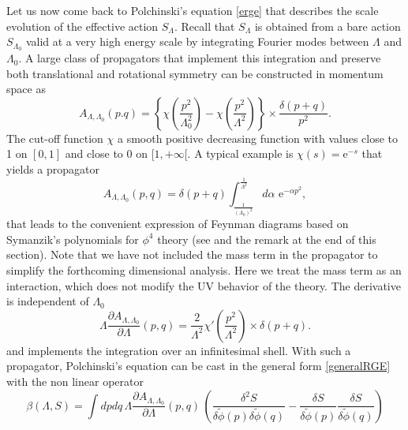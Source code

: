 \documentclass[10pt,here,feynmf]{article}
\begin{document}
Let us now come back to Polchinski's equation \eqref{erge} that describes the scale evolution of the effective action $S_{\Lambda}$. Recall that $S_{\Lambda}$ is obtained from a bare action $S_{\Lambda_{0}}$ valid at a very high energy scale by integrating Fourier modes between $\Lambda$ and $\Lambda_{0}$. A large class of propagators that implement this integration and preserve both translational and rotational symmetry can be constructed in momentum space as
\begin{equation}    
A_{\Lambda,\Lambda_{0}}(p.q)=
\left\{\chi\left(\frac{p^{2}}{\Lambda_{0}^{2}}\right)-\chi\left(\frac{p^{2}}{\Lambda^{2}}\right)\right\}
\times\frac{\delta(p+q)}{p^{2}}.
\end{equation}
The cut-off function $\chi$ a smooth positive decreasing function with values close to 1 on $[0,1]$ and close to 0 on $[1,+\infty[$. A typical example is $\chi(s)=\mathrm{e}^{-s}$ that yields a propagator 
\begin{equation}
A_{\Lambda,\Lambda_{0}}(p,q)=\delta(p+q)\int^{\frac{1}{\Lambda^{2}}}_{\frac{1}{(\Lambda_{0})^{2}}}\!\!d\alpha\,\,\mathrm{e}^{-\alpha p^{2}},
\end{equation}
that leads to the convenient expression of Feynman diagrams based on Symanzik's polynomials for $\phi^{4}$ theory (see \cite{Rivasseau} and the remark at the end of this section). Note that we have not included the mass term in the propagator to simplify the forthcoming dimensional analysis. Here we treat the mass term as an interaction, which does not modify the UV behavior of the theory.  The derivative is independent of $\Lambda_{0}$
\begin{equation}
\Lambda\frac{\partial A_{\Lambda,\Lambda_{0}}}{\partial\Lambda}(p,q)=
\frac{2}{\Lambda^{2}}\chi'\left(\frac{p^{2}}{\Lambda^{2}}\right)
\times\delta(p+q).
\end{equation}
and implements the integration over an infinitesimal shell.  With such a propagator, Polchinski's equation can be cast in the general form \eqref{generalRGE} with the non linear operator
\begin{equation}
\beta(\Lambda,S)=\int dpdq\,\Lambda\frac{\partial A_{\Lambda,\Lambda_{0}}}{\partial\Lambda}(p,q)\,
\left(
\frac{\delta^{2}S}{\delta\widetilde{\phi}(p)\delta\widetilde{\phi}(q)}- \frac{\delta
S}{\delta\widetilde{\phi}(p)} \frac{\delta S}{\delta\widetilde{\phi}(q)} \right)
\end{equation}
\end{document}
